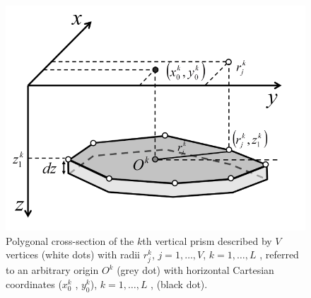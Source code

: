 \begin{figure}
    \centering
    \includegraphics[scale=0.3]{figures/prism_parameters_mod.png}
    \caption{Polygonal cross-section of the $k$th vertical prism described by $V$ vertices (white dots) with radii $r^k_j$, $j = 1, \dots, V$, $k = 1, \dots, L$ , referred to an arbitrary origin $O^k$ (grey dot) with horizontal Cartesian coordinates ($x_0^k$ , $y_0^k$), $k = 1, \dots, L$ , (black dot).}
    \label{fig:prism_parameters}
\end{figure}


